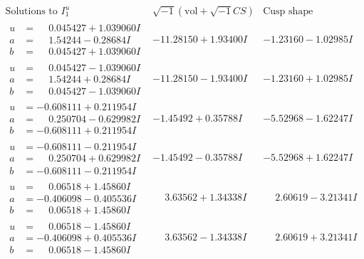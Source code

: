 \documentclass[1p]{elsarticle_modified}
\theoremstyle{definition}
\newcommand{\I}{\sqrt{-1}}
\begin{document}
$$\begin{array}{c|c|c}  
\text{Solutions to }I^u_{1}& \I (\text{vol} + \sqrt{-1}CS) & \text{Cusp shape}\\
 \hline 
\begin{aligned}
u &= \phantom{-}0.045427 + 1.039060 I \\
a &= \phantom{-}1.54244 - 0.28684 I \\
b &= \phantom{-}0.045427 + 1.039060 I\end{aligned}
 & -11.28150 + 1.93400 I & -1.23160 - 1.02985 I \\ \hline\begin{aligned}
u &= \phantom{-}0.045427 - 1.039060 I \\
a &= \phantom{-}1.54244 + 0.28684 I \\
b &= \phantom{-}0.045427 - 1.039060 I\end{aligned}
 & -11.28150 - 1.93400 I & -1.23160 + 1.02985 I \\ \hline\begin{aligned}
u &= -0.608111 + 0.211954 I \\
a &= \phantom{-}0.250704 - 0.629982 I \\
b &= -0.608111 + 0.211954 I\end{aligned}
 & -1.45492 + 0.35788 I & -5.52968 - 1.62247 I \\ \hline\begin{aligned}
u &= -0.608111 - 0.211954 I \\
a &= \phantom{-}0.250704 + 0.629982 I \\
b &= -0.608111 - 0.211954 I\end{aligned}
 & -1.45492 - 0.35788 I & -5.52968 + 1.62247 I \\ \hline\begin{aligned}
u &= \phantom{-}0.06518 + 1.45860 I \\
a &= -0.406098 - 0.405536 I \\
b &= \phantom{-}0.06518 + 1.45860 I\end{aligned}
 & \phantom{-}3.63562 + 1.34338 I & \phantom{-}2.60619 - 3.21341 I \\ \hline\begin{aligned}
u &= \phantom{-}0.06518 - 1.45860 I \\
a &= -0.406098 + 0.405536 I \\
b &= \phantom{-}0.06518 - 1.45860 I\end{aligned}
 & \phantom{-}3.63562 - 1.34338 I & \phantom{-}2.60619 + 3.21341 I \\ \hline\begin{aligned}

\end{aligned}
\end{array}$$
\end{document}
